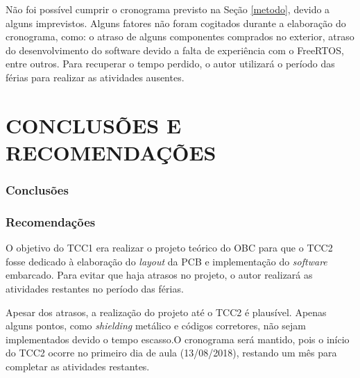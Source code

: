 Não foi possível cumprir o cronograma previsto na Seção \ref{metodo}, devido a alguns imprevistos. Alguns fatores não foram cogitados durante a elaboração do cronograma, como: o atraso de alguns componentes comprados no exterior, atraso do desenvolvimento do software devido a falta de experiência com o FreeRTOS, entre outros. Para recuperar o tempo perdido, o autor utilizará o período das férias para realizar as atividades ausentes. 


\chapter[CONCLUSÕES E RECOMENDAÇÕES]{CONCLUSÕES E RECOMENDAÇÕES}

\subsection{Conclusões}

\subsection{Recomendações}

O objetivo do TCC1 era realizar o projeto teórico do OBC para que o TCC2 fosse dedicado à elaboração do \textit{layout} da PCB e implementação do \textit{software} embarcado. Para evitar que haja atrasos no projeto, o autor realizará as atividades restantes no período das férias.

Apesar dos atrasos, a realização do projeto até o TCC2 é plausível. Apenas alguns pontos, como \textit{shielding} metálico e códigos corretores, não sejam implementados devido o tempo escasso.O cronograma será mantido, pois o início do TCC2 ocorre no primeiro dia de aula (13/08/2018), restando um mês para completar as atividades restantes.




